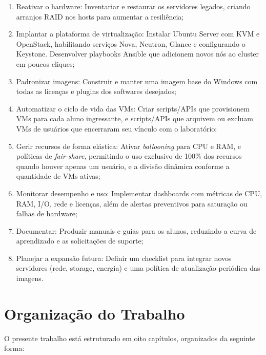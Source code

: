 \begin{enumerate}
    \item Reativar o hardware: Inventariar e restaurar os servidores legados, criando arranjos RAID nos hosts para aumentar a resiliência;
    \item Implantar a plataforma de virtualização: Instalar Ubuntu Server com KVM e OpenStack, habilitando serviços Nova, Neutron, Glance e configurando o Keystone. Desenvolver playbooks Ansible que adicionem novos nós ao cluster em poucos cliques;
    \item Padronizar imagens: Construir e manter uma imagem base do Windows com todas as licenças e plugins dos softwares desejados;
    \item Automatizar o ciclo de vida das VMs: Criar scripts/APIs que provisionem VMs para cada aluno ingressante, e scripts/APIs que arquivem ou excluam VMs de usuários que encerraram seu vínculo com o laboratório;
    \item Gerir recursos de forma elástica: Ativar \textit{ballooning} para CPU e RAM, e políticas de \textit{fair-share}, permitindo o uso exclusivo de 100\% dos recursos quando houver apenas um usuário, e a divisão dinâmica conforme a quantidade de VMs ativas;
    \item Monitorar desempenho e uso: Implementar dashboards com métricas de CPU, RAM, I/O, rede e licenças, além de alertas preventivos para saturação ou falhas de hardware;
    \item Documentar: Produzir manuais e guias para os alunos, reduzindo a curva de aprendizado e as solicitações de suporte;
    \item Planejar a expansão futura: Definir um checklist para integrar novos servidores (rede, storage, energia) e uma política de atualização periódica das imagens.
\end{enumerate}

\section{Organização do Trabalho}

O presente trabalho está estruturado em oito capítulos, organizados da seguinte forma:

